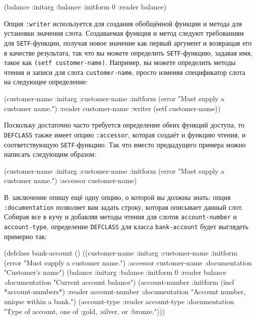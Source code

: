 \begin{myverb}
(balance
 :initarg :balance
 :initform 0
 :reader balance)
\end{myverb}

Опция \lstinline{:writer} используется для создания обобщённой функции и метода для установки
значения слота.  Создаваемая функция и метод следуют требованиям для \lstinline{SETF}-функции,
получая новое значение как первый аргумент и возвращая его в качестве результата, так что
вы можете определить \lstinline{SETF}-функцию, задавая имя, такое как \lstinline{(setf customer-name)}.
Например, вы можете определить методы чтения и записи для слота
\lstinline{customer-name}, просто изменяя спецификатор слота на следующее определение:

\begin{myverb}
(customer-name
 :initarg :customer-name
 :initform (error "Must supply a customer name.")
 :reader customer-name
 :writer (setf customer-name))
\end{myverb}

Поскольку достаточно часто требуется определение обеих функций доступа, то \lstinline{DEFCLASS}
также имеет опцию \lstinline{:accessor}, которая создаёт и функцию чтения, и соответствующую
\lstinline{SETF}-функцию.  Так что вместо предыдущего примера можно написать следующим образом:

\begin{myverb}
(customer-name
 :initarg :customer-name
 :initform (error "Must supply a customer name.")
 :accessor customer-name)
\end{myverb}

В~заключение опишу ещё одну опцию, о которой вы должны знать: опция \lstinline{:documentation}
позволяет вам задать строку, которая описывает данный слот.  Собирая все в кучу и добавляя
методы чтения для слотов \lstinline{account-number} и \lstinline{account-type}, определение
\lstinline{DEFCLASS} для класса \lstinline{bank-account} будет выглядеть примерно так:

\begin{myverb}
(defclass bank-account ()
  ((customer-name
    :initarg :customer-name
    :initform (error "Must supply a customer name.")
    :accessor customer-name
    :documentation "Customer's name")
   (balance
    :initarg :balance
    :initform 0
    :reader balance
    :documentation "Current account balance")
   (account-number
    :initform (incf *account-numbers*)
    :reader account-number
    :documentation "Account number, unique within a bank.")
   (account-type
    :reader account-type
    :documentation "Type of account, one of :gold, :silver, or :bronze.")))
\end{myverb}

